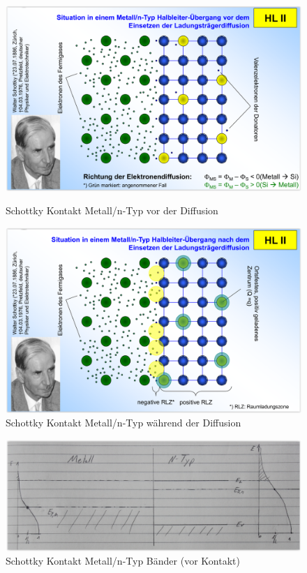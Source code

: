 \documentclass[12pt,a4paper]{report}%
\numberwithin{equation}{section}
\numberwithin{equation}{subsection}
\begin{document}
	\begin{figure}[H] 
		\centering
		\begin{minipage}{.5\textwidth}
		  \centering
		  \captionsetup{justification=centering}
		  \includegraphics[width=0.95\linewidth]{schottky_m-n_vorher.png}
		  \caption{Schottky Kontakt Metall/n-Typ vor der Diffusion \protect\cite{MIKRO2}}
		  \label{fig:schottky_m-n}
		\end{minipage}%
		\begin{minipage}{.5\textwidth}
		  \centering
		  \captionsetup{justification=centering}
		  \includegraphics[width=0.95\linewidth]{schottky_m-n_nachher.png}
		  \caption{Schottky Kontakt Metall/n-Typ während der Diffusion \protect\cite{MIKRO2}}
		  \label{fig:schottky_m-n_diff}
		\end{minipage}
  \end{figure}
  \begin{figure}[H]
	  \centering
	  \captionsetup{justification=centering}
	  \includegraphics[width=0.8\linewidth]{schottky_m-n_banddiagramm.png}
	  \caption{Schottky Kontakt Metall/n-Typ Bänder (vor Kontakt)}
	  \label{fig:schottky_m-n_banddiagramm}
	\end{figure}
\end{document}
